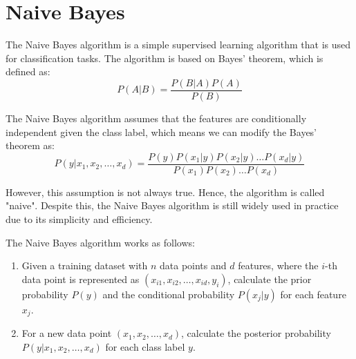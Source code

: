 \documentclass[a4paper,12pt]{article}
\begin{document}
\section{Naive Bayes}

The Naive Bayes algorithm is a simple supervised learning algorithm that is used for classification tasks. The algorithm is based on Bayes' theorem, which is defined as:
\begin{equation*}
  P(A|B) = \frac{P(B|A) P(A)}{P(B)}
\end{equation*}

The Naive Bayes algorithm assumes that the features are conditionally independent given the class label, which means we can modify the Bayes' theorem as:
\begin{equation*}
  P(y|x_1, x_2, \ldots, x_d) = \frac{P(y) P(x_1|y) P(x_2|y) \ldots P(x_d|y)}{P(x_1) P(x_2) \ldots P(x_d)}
\end{equation*}

However, this assumption is not always true. Hence, the algorithm is called "naive". Despite this, the Naive Bayes algorithm is still widely used in practice due to its simplicity and efficiency.

The Naive Bayes algorithm works as follows:
\begin{enumerate}
  \item Given a training dataset with $n$ data points and $d$ features, where the $i$-th data point is represented as $(x_{i1}, x_{i2}, \ldots, x_{id}, y_i)$, calculate the prior probability $P(y)$ and the conditional probability $P(x_j|y)$ for each feature $x_j$.
  \item For a new data point $(x_1, x_2, \ldots, x_d)$, calculate the posterior probability $P(y|x_1, x_2, \ldots, x_d)$ for each class label $y$.
\end{enumerate}
\end{document}
